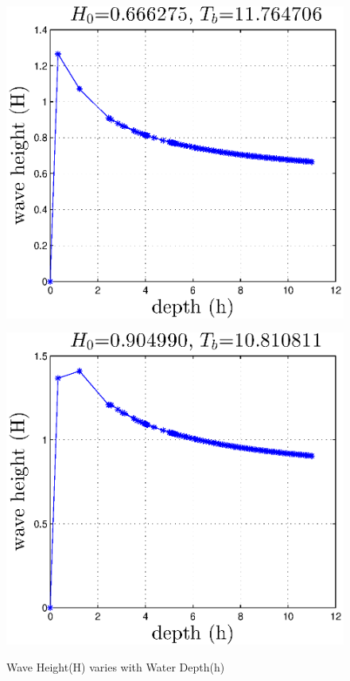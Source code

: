 \begin{figure}[h]
\begin{minipage}[b]{0.47\linewidth}
\centering
\includegraphics[width=\textwidth]{forward_plot/p1_5.eps}
\label{FigH_1}
\end{minipage}
\hspace{0.2cm}
\begin{minipage}[b]{0.47\linewidth}
\centering
\includegraphics[width=\textwidth]{forward_plot/p2_5.eps}
\label{FigH_2}
\end{minipage}
\caption{Wave Height(H) varies with Water Depth(h)}
\end{figure}

